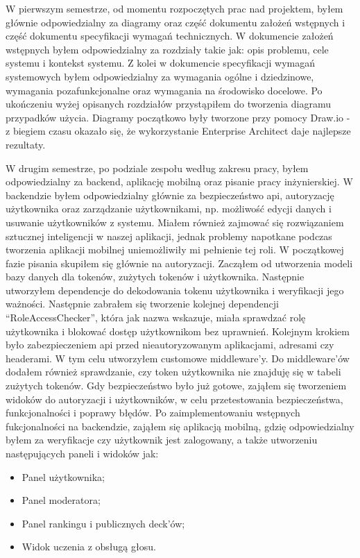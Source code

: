 W pierwszym semestrze, od momentu rozpoczętych prac nad projektem, byłem głównie odpowiedzialny za diagramy oraz część
dokumentu założeń wstępnych i część dokumentu specyfikacji wymagań technicznych. W dokumencie założeń wstępnych byłem
odpowiedzialny za rozdziały takie jak: opis problemu, cele systemu i kontekst systemu. Z kolei w dokumencie
specyfikacji wymagań systemowych byłem odpowiedzialny za wymagania ogólne i dziedzinowe, wymagania pozafunkcjonalne
oraz wymagania na środowisko docelowe. Po ukończeniu wyżej opisanych rozdziałów przystąpiłem do tworzenia diagramu
przypadków użycia. Diagramy początkowo były tworzone przy pomocy Draw.io - z biegiem czasu okazało się, że wykorzystanie Enterprise Architect daje najlepsze rezultaty.
\par W drugim semestrze, po podziale zespołu według zakresu pracy, byłem odpowiedzialny za backend, aplikację
mobilną oraz pisanie pracy inżynierskiej. W backendzie byłem odpowiedzialny głównie za bezpieczeństwo api, autoryzację
użytkownika oraz zarządzanie użytkownikami, np. możliwość edycji danych i usuwanie użytkowników z systemu.
Miałem również zajmować się rozwiązaniem sztucznej inteligencji w naszej aplikacji, jednak problemy napotkane podczas
tworzenia aplikacji mobilnej uniemożliwiły mi pełnienie tej roli. W początkowej fazie pisania skupiłem się głównie na
autoryzacji. Zacząłem od utworzenia modeli bazy danych dla tokenów, zużytych tokenów i użytkownika. Następnie
utworzyłem dependencje do dekodowania tokenu użytkownika i weryfikacji jego ważności. Następnie zabrałem się tworzenie
kolejnej dependencji “RoleAccessChecker”, która jak nazwa wskazuje, miała sprawdzać rolę użytkownika i blokować dostęp
użytkownikom bez uprawnień. Kolejnym krokiem było zabezpieczeniem api przed nieautoryzowanym aplikacjami, adresami czy
headerami. W tym celu utworzyłem customowe middleware’y. Do middleware’ów dodałem również sprawdzanie, czy token
użytkownika nie znajduję się w tabeli zużytych tokenów. Gdy bezpieczeństwo było już gotowe, zająłem się tworzeniem
widoków do autoryzacji i użytkowników, w celu przetestowania bezpieczeństwa, funkcjonalności i poprawy błędów.
Po zaimplementowaniu wstępnych fukcjonalności na backendzie, zająłem się aplikacją mobilną, gdzię odpowiedzialny byłem
za weryfikacje czy użytkownik jest zalogowany, a także utworzeniu następujących paneli i widoków jak:

\begin{itemize}
    \item Panel użytkownika;
    \item Panel moderatora;
    \item Panel rankingu i publicznych deck’ów;
    \item Widok uczenia z obsługą głosu.
\end{itemize}

